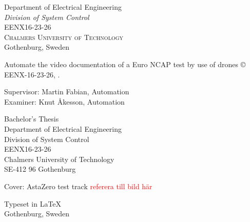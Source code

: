 \begin{center}
\begin{figure}[H]
    \fi
	\end{figure}	\vspace{5mm}	
	
	Department of Electrical Engineering \\
	\emph{Division of System Control}\\
	EENX16-23-26\\
	\textsc{Chalmers University of Technology} \\
	Gothenburg, Sweden \the\year \\
\end{center}


\newpage
\thispagestyle{plain}

Automate the video documentation of a Euro
NCAP test by use of drones
\copyright ~ EENX-16-23-26, \the\year. \setlength{\parskip}{1cm}

Supervisor: Martin Fabian, Automation\\
Examiner: Knut Åkesson, Automation \setlength{\parskip}{1cm}

Bachelor's Thesis \the\year\\	
Department of Electrical Engineering\\
Division of System Control\\
EENX16-23-26\\
Chalmers University of Technology\\
SE-412 96 Gothenburg\\ \setlength{\parskip}{0.5cm}

\vfill
Cover: AstaZero test track 
\textcolor{red}{referera till bild här}\setlength{\parskip}{0.5cm}

Typeset in \LaTeX \tagtemp\\
Gothenburg, Sweden \the\year

